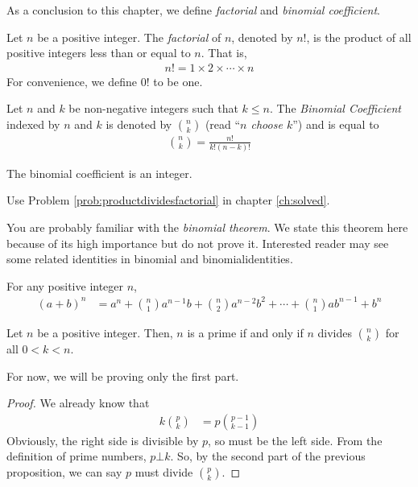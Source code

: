 \documentclass{subfile}
\begin{document}
As a conclusion to this chapter, we define \textit{factorial} and \textit{binomial coefficient}.

		\begin{definition}[Factorial]
			Let $n$ be a positive integer. The \textit{factorial} of $n$, denoted by $n!$, is the product of all positive integers less than or equal to $n$. That is,
				\begin{align*}
					n! = 1 \times 2 \times \cdots \times n
				\end{align*}
			For convenience, we define $0!$ to be one.
		\end{definition}

		\begin{definition}
			Let $n$ and $k$ be non-negative integers such that $k \leq n$. The \textit{Binomial Coefficient} indexed by $n$ and $k$ is denoted by $\displaystyle \binom{n}{k}$ (read ``\textit{$n$ choose $k$}'') and is equal to
				\begin{align*}
					\binom{n}{k} = \frac{n!}{k!(n-k)!}
				\end{align*}
		\end{definition}

		\begin{proposition}
			The binomial coefficient is an integer.
		\end{proposition}

		\begin{hint}
			Use Problem \ref{prob:productdividesfactorial} in chapter \autoref{ch:solved}.
		\end{hint}
	You are probably familiar with the \textit{binomial theorem}. We state this theorem here because of its high importance but do not prove it. Interested reader may see some related identities in \gls{binomial} and \gls{binomialidentities}.
		\begin{theorem}
			For any positive integer $n$,
				\begin{align*}
					(a+b)^n & = a^n+\binom{n}{1}a^{n-1}b+\binom{n}{2}a^{n-2}b^2+\cdots+\binom{n}{1}ab^{n-1}+b^n
				\end{align*}
		\end{theorem}

		\begin{theorem}\label{thm:binpdiv}
			Let $n$ be a positive integer. Then, $n$ is a prime if and only if $n$ divides $\binom{n}{k}$ for all $0<k<n$.
		\end{theorem}%
	For now, we will be proving only the first part.
		\begin{proof}
			We already know that
				\begin{align*}
					k\binom{p}{k} & = p\binom{p-1}{k-1}
				\end{align*}
			Obviously, the right side is divisible by $p$, so must be the left side. From the definition of prime numbers, $p\bot k$. So, by the second part of the previous proposition, we can say $p$ must divide $\binom{p}{k}$.
		\end{proof}
\end{document}
